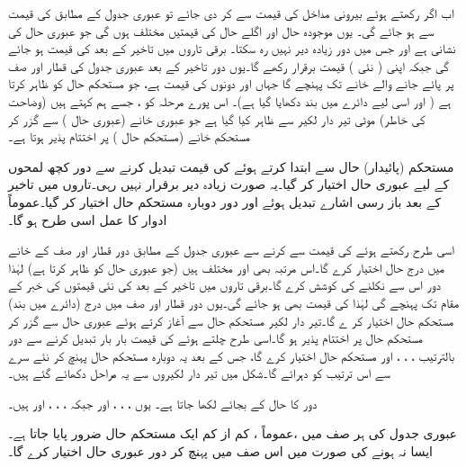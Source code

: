 اب اگر  رکھتے ہوئے بیرونی مداخل  کی قیمت  سے  کر دی جائے تو عبوری جدول کے مطابق  کی قیمت  سے  ہو جائے گی۔ یوں موجودہ حال  اور اگلے حال  کی قیمتیں مختلف ہوں گی جو عبوری حال کی نشانی ہے اور جس میں دور زیادہ دیر نہیں رہ سکتا۔ برقی تاروں میں تاخیر کے بعد  کی قیمت  ہو جائے گی جبکہ  اپنی ( نئی ) قیمت  برقرار رکھے گا۔یوں دور تاخیر کے بعد عبوری جدول کی  قطار اور  صف پر پائے جانے والے خانے تک پہنچے گا جہاں  اور  دونوں کی قیمت  ہے، جو مستحکم حال کو ظاہر کرتا ہے ( اور اسی لیے دائرے میں بند دکھایا گیا ہے)۔ اس پورے مرحلہ کو   ، جسے ہم  کہتے ہیں (وضاحت کی خاطر)  موٹی   تیر دار لکیر سے ظاہر کیا گیا ہے جو عبوری خانے  (عبوری حال ) سے گزر کر مستحکم خانے (مستحکم حال   )  پر اختتام پذیر ہوتا ہے۔

 مستحکم (پائیدار) حال سے ابتدا کرتے ہوئے  کی قیمت تبدیل کرنے سے دور کچھ لمحوں کے لیے عبوری حال اختیار کر گیا۔یہ صورت زیادہ دیر برقرار نہیں رہی۔تاروں میں تاخیر کے بعد باز رسی اشارے تبدیل ہوئے اور دور دوبارہ مستحکم حال اختیار کر گیا۔عموماً ادوار کا عمل اسی طرح ہو گا۔

اسی طرح  رکھتے ہوئے  کی قیمت  سے  کرنے سے عبوری جدول کے مطابق دور  قطار اور  صف کے خانے میں درج حال  اختیار کرے گا۔اس مرتبہ بھی  اور  مختلف ہیں (جو عبوری حال کو ظاہر کرتا ہے) لہٰذا دور اس سے نکلنے کی کوشش کرے گا۔برقی تاروں میں تاخیر کے بعد  کی نئی قیمتوں کی خبر  کے مقام تک پہنچے گی لہٰذا  کی قیمت بھی  ہو جائے گی۔یوں دور  قطار اور  صف میں درج (دائرے میں بند) مستحکم حال  اختیار کر ے گا۔تیر دار لکیر مستحکم حال   سے  آغاز کرتے ہوئے عبوری حال  سے گزر کر مستحکم حال   پر اختتام پذیر ہو گا۔اسی طرح چلتے ہوئے  کی قیمت بار بار تبدیل کرنے سے دور بالترتیب  ، ، ، اور  مستحکم حال اختیار کرے گا، جس کے بعد یہ  دوبارہ مستحکم حال  پہنچ کر نئے سرے سے اس ترتیب کو دہرائے گا۔شکل میں تیر دار لکیروں سے یہ مراحل دکھائے گئے ہیں۔

 دور کا حال  کے بجائے  لکھا جاتا ہے۔ یوں ، ، ، اور  جبکہ ، ، ، اور  ہیں۔
 
عبوری جدول کی ہر صف میں ،عموماً ، کم از کم ایک مستحکم حال ضرور پایا جاتا ہے۔ایسا نہ ہونے کی صورت میں اس صف میں پہنچ کر دور عبوری حال اختیار کرے گا۔

